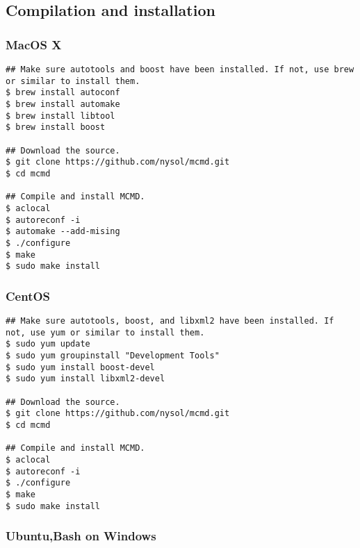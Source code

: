\subsection{Compilation and installation}
\subsubsection{MacOS X\\} %

\begin{Verbatim}[baselinestretch=0.7,frame=single]
## Make sure autotools and boost have been installed. If not, use brew or similar to install them.
$ brew install autoconf
$ brew install automake
$ brew install libtool
$ brew install boost

## Download the source.
$ git clone https://github.com/nysol/mcmd.git
$ cd mcmd

## Compile and install MCMD.
$ aclocal
$ autoreconf -i
$ automake --add-mising
$ ./configure
$ make
$ sudo make install
\end{Verbatim}

\subsubsection{CentOS\\}

\begin{Verbatim}[baselinestretch=0.7,frame=single]
## Make sure autotools, boost, and libxml2 have been installed. If not, use yum or similar to install them.
$ sudo yum update
$ sudo yum groupinstall "Development Tools"
$ sudo yum install boost-devel
$ sudo yum install libxml2-devel

## Download the source.
$ git clone https://github.com/nysol/mcmd.git
$ cd mcmd

## Compile and install MCMD.
$ aclocal
$ autoreconf -i
$ ./configure
$ make
$ sudo make install
\end{Verbatim}

\subsubsection{Ubuntu,Bash on Windows\\}

